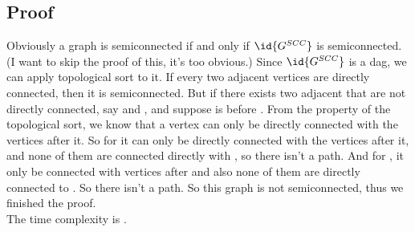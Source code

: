 \documentclass[a4paper]{article}
\begin{document}
\subsection*{Proof}
Obviously a graph  is semiconnected if and only if $\id{G^{SCC}}$ is semiconnected. (I want to skip the proof of this, it's too obvious.)
Since $\id{G^{SCC}}$ is a dag, we can apply topological sort to it. If every two adjacent vertices are directly connected, then it is semiconnected. But if
there exists two adjacent that are not directly connected, say  and , and suppose  is before . From the property of the topological sort,
we know that a vertex can only be directly connected with the vertices after it. So for  it can only be directly connected with the vertices after it, and none of them are connected directly with
, so there isn't a  path. And for , it only be connected with vertices after  and also none of them are directly connected to . So there isn't a  path. So this graph is
not semiconnected, thus we finished the proof.\\
The time complexity is .
\end{document}
